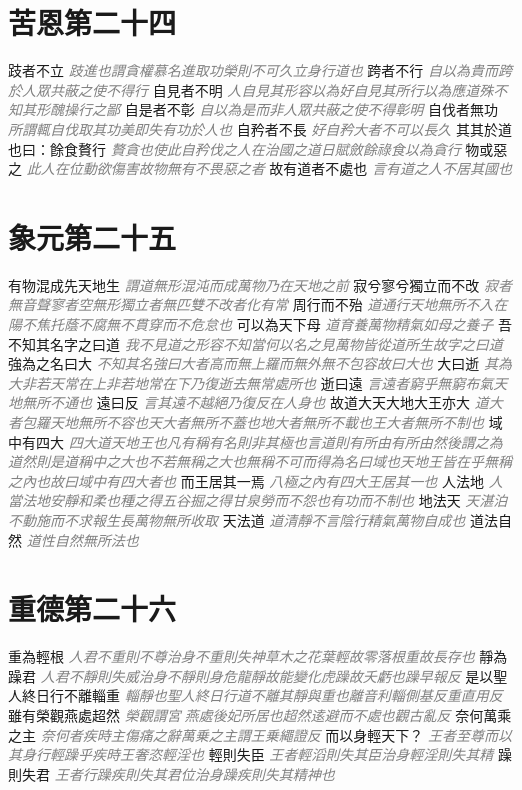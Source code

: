 \documentclass[a4paper,zihao=-4,oneside,landscape,UTF8]{ctexart}
\newcommand{\zhushi}[1]{\scriptsize{\textit{\textcolor{gray}{#1}}}\normalsize}
\begin{document}
\section{苦恩第二十四}

跂者不立
\zhushi{跂進也謂貪權慕名進取功榮則不可久立身行道也}
跨者不行
\zhushi{自以為貴而跨於人眾共蔽之使不得行}
自見者不明
\zhushi{人自見其形容以為好自見其所行以為應道殊不知其形醜操行之鄙}
自是者不彰
\zhushi{自以為是而非人眾共蔽之使不得彰明}
自伐者無功
\zhushi{所謂輒自伐取其功美即失有功於人也}
自矜者不長
\zhushi{好自矜大者不可以長久}
其其於道也曰：餘食贅行
\zhushi{贅貪也使此自矜伐之人在治國之道日賦斂餘祿食以為貪行}
物或惡之
\zhushi{此人在位動欲傷害故物無有不畏惡之者}
故有道者不處也
\zhushi{言有道之人不居其國也}


\section{象元第二十五}

有物混成先天地生
\zhushi{謂道無形混沌而成萬物乃在天地之前}
寂兮寥兮獨立而不改
\zhushi{寂者無音聲寥者空無形獨立者無匹雙不改者化有常}
周行而不殆
\zhushi{道通行天地無所不入在陽不焦托蔭不腐無不貫穿而不危怠也}
可以為天下母
\zhushi{道育養萬物精氣如母之養子}
吾不知其名字之曰道
\zhushi{我不見道之形容不知當何以名之見萬物皆從道所生故字之曰道}
強為之名曰大
\zhushi{不知其名強曰大者高而無上羅而無外無不包容故曰大也}
大曰逝
\zhushi{其為大非若天常在上非若地常在下乃復逝去無常處所也}
逝曰遠
\zhushi{言遠者窮乎無窮布氣天地無所不通也}
遠曰反
\zhushi{言其遠不越絕乃復反在人身也}
故道大天大地大王亦大
\zhushi{道大者包羅天地無所不容也天大者無所不蓋也地大者無所不載也王大者無所不制也}
域中有四大
\zhushi{四大道天地王也凡有稱有名則非其極也言道則有所由有所由然後謂之為道然則是道稱中之大也不若無稱之大也無稱不可而得為名曰域也天地王皆在乎無稱之內也故曰域中有四大者也}
而王居其一焉
\zhushi{八極之內有四大王居其一也}
人法地
\zhushi{人當法地安靜和柔也種之得五谷掘之得甘泉勞而不怨也有功而不制也}
地法天
\zhushi{天湛泊不動施而不求報生長萬物無所收取}
天法道
\zhushi{道清靜不言陰行精氣萬物自成也}
道法自然
\zhushi{道性自然無所法也}


\section{重德第二十六}

重為輕根
\zhushi{人君不重則不尊治身不重則失神草木之花葉輕故零落根重故長存也}
靜為躁君
\zhushi{人君不靜則失威治身不靜則身危龍靜故能變化虎躁故夭虧也躁早報反}
是以聖人終日行不離輜重
\zhushi{輜靜也聖人終日行道不離其靜與重也離音利輜側基反重直用反}
雖有榮觀燕處超然
\zhushi{榮觀謂宮𨵗燕處後妃所居也超然逺避而不處也觀古亂反}
奈何萬乘之主
\zhushi{奈何者疾時主傷痛之辭萬乗之主謂王乗繩證反}
而以身輕天下？
\zhushi{王者至尊而以其身行輕躁乎疾時王奢恣輕淫也}
輕則失臣
\zhushi{王者輕滔則失其臣治身輕淫則失其精}
躁則失君
\zhushi{王者行躁疾則失其君位治身躁疾則失其精神也}
\end{document}

